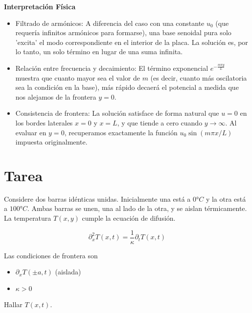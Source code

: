 \documentclass[a4paper]{article}
\begin{document}
\textbf{Interpretación Física}
\begin{itemize}
	\item Filtrado de armónicos: A diferencia del caso con una constante $u_0$ (que requería infinitos armónicos para formarse), una base senoidal pura solo 'excita' el modo correspondiente en el interior de la placa. La solución es, por lo tanto, un solo término en lugar de una suma infinita.
	\item Relación entre frecuencia y decaimiento: El término exponencial $e^{-\frac{m\pi y}{L}}$ muestra que cuanto mayor sea el valor de $m$ (es decir, cuanto más oscilatoria sea la condición en la base), más rápido decaerá el potencial a medida que nos alejamos de la frontera $y=0$.
	\item Consistencia de frontera: La solución satisface de forma natural que $u=0$ en los bordes laterales $x=0$ y $x=L$, y que tiende a cero cuando $y \to \infty$. Al evaluar en $y=0$, recuperamos exactamente la función $u_0 \sin(m\pi x / L)$ impuesta originalmente.
\end{itemize}

\section{Tarea}

Considere dos barras idénticas unidas. Inicialmente una está a $0°C$ y la otra está a $100°C$. Ambas barras se unen, una al lado de la otra, y se aislan térmicamente. La temperatura $T(x, y)$ cumple la ecuación de difusión.

$$\partial_x^2 T(x, t) = \frac{1}{\kappa}\partial_t T(x, t)$$

Las condiciones de frontera son

\begin{itemize}
	\item $\partial_x T(\pm a,t)$ (aislada)
	\item $\kappa>0$
\end{itemize}

Hallar $T(x,t)$.


 
\end{document}
